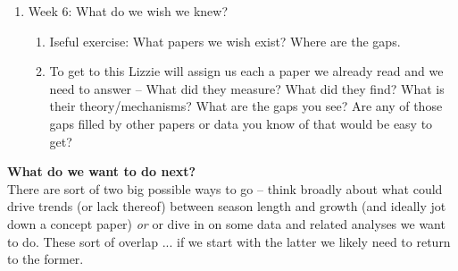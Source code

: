 \documentclass[11pt,letter]{article}
\begin{document}
\begin{enumerate}
\begin{enumerate}
\item What is the minimum amount of physiology that Alana wants? NSC weekly would be useful (and something else I missed)
\end{enumerate}
\item Week 6:  What do we wish we knew?
\begin{enumerate}
\item Iseful exercise: What papers we wish exist? Where are the gaps. 
\item To get to this Lizzie will assign us each a paper we already read and we need to answer -- What did they measure? What did they find? What is their theory/mechanisms? What are the gaps you see? Are any of those gaps filled by other papers or data you know of that would be easy to get? 
\end{enumerate}
\end{enumerate}


{\bf What do we want to do next?}\\

There are sort of two big possible ways to go -- think broadly about what could drive trends (or lack thereof) between season length and growth (and ideally jot down a concept paper) \emph{or} or dive in on some data and related analyses we want to do. These sort of overlap ... if we start with the latter we likely need to return to the former.
\end{document}
